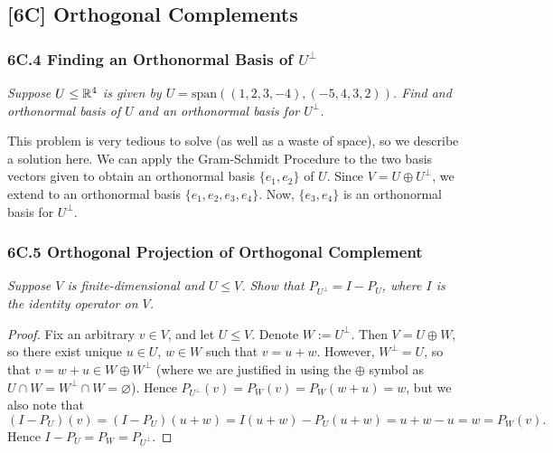 \documentclass{article}
\begin{document}
\subsection*{[6C] Orthogonal Complements}
\subsubsection*{6C.4 Finding an Orthonormal Basis of $U^\perp$}

\textit{Suppose $U\leq\mathbb R^4$ is given by $U = \mathrm{span}((1,2,3,-4), (-5,4,3,2))$. Find and orthonormal basis of $U$ and an orthonormal basis for $U^\perp$.}

This problem is very tedious to solve (as well as a waste of space), so we describe a solution here. We can apply the Gram-Schmidt Procedure to the two basis vectors given to obtain an orthonormal basis $\{e_1, e_2\}$ of $U$. Since $V = U \oplus U^\perp$, we extend to an orthonormal basis $\{e_1, e_2, e_3, e_4\}$. Now, $\{e_3, e_4\}$ is an orthonormal basis for $U^\perp$.

\subsubsection*{6C.5 Orthogonal Projection of Orthogonal Complement}
\textit{Suppose $V$ is finite-dimensional and $U\leq V$. Show that $P_{U^\perp} = I - P_U$, where $I$ is the identity operator on $V$.}
\begin{proof}
Fix an arbitrary $v\in V$, and let $U\leq V$. Denote $W := U^{\perp}$. Then $V = U\oplus W$, so there exist unique $u\in U$, $w\in W$ such that $v = u+w$. However, $W^\perp = U$, so that $v = w + u \in W\oplus W^{\perp}$ (where we are justified in using the $\oplus$ symbol as $U\cap W = W^{\perp}\cap W = \varnothing$). Hence $P_{U^\perp}(v) = P_W(v) = P_W(w+u) = w$, but we also note that
$$(I-P_U)(v) = (I-P_U)(u+w) = I(u+w) - P_U(u+w) = u+w-u = w = P_W(v).$$
Hence $I-P_U = P_W = P_{U^\perp}$.
\end{proof}
\end{document}
